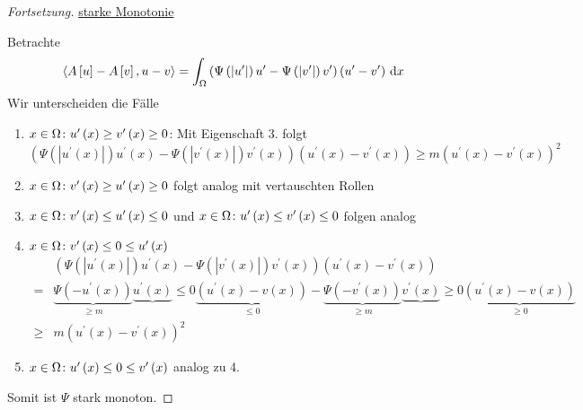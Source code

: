 \begin{proof}[Fortsetzung]
	\underline{starke Monotonie}
	
	Betrachte
	\begin{equation*}
		\left<A\left[u\right]-A\left[v\right],u-v\right> = \int_{\Omega}\left(\Psi\left(|u^{\prime}|\right)u^{\prime}-\Psi\left(|v^{\prime}|\right)v^{\prime}\right)\left(u^{\prime}-v^{\prime}\right)\,\mathrm{d} x
	\end{equation*}
	Wir unterscheiden die Fälle
	\begin{enumerate}
		\item $x\in\Omega\colon u^{\prime}\left(x\right)\geq v^{\prime}\left(x\right)\geq 0$: Mit Eigenschaft 3. folgt
		\begin{equation*}
			\left(\Psi\left(|u^{\prime}\left(x\right)|\right)u^{\prime}\left(x\right) - \Psi\left(|v^{\prime}\left(x\right)|\right)v^{\prime}\left(x\right)\right)\left(u^{\prime}\left(x\right)-v^{\prime}\left(x\right)\right) \geq m\left(u^{\prime}\left(x\right)-v^{\prime}\left(x\right)\right)^{2}
		\end{equation*}
		\item $x\in\Omega\colon v^{\prime}\left(x\right)\geq u^{\prime}\left(x\right)\geq 0$ folgt analog mit vertauschten Rollen
		\item $x\in\Omega\colon v^{\prime}\left(x\right)\leq u^{\prime}\left(x\right)\leq 0$ und $x\in\Omega\colon u^{\prime}\left(x\right)\leq v^{\prime}\left(x\right)\leq 0$ folgen analog
		\item $x\in\Omega\colon v^{\prime}\left(x\right)\leq 0 \leq u^{\prime}\left(x\right)${}
		\begin{align*}
			&\left(\Psi\left(|u^{\prime}\left(x\right)|\right)u^{\prime}\left(x\right)-\Psi\left(|v^{\prime}\left(x\right)|\right)v^{\prime}\left(x\right)\right)\left(u^{\prime}\left(x\right)-v^{\prime}\left(x\right)\right)\\ 
			= &\underbrace{\Psi\left(-u^{\prime}\left(x\right)\right)}_{\geq m}\underbrace{u^{\prime}\left(x\right)}{\leq 0}\underbrace{\left(u^{\prime}\left(x\right)-v\left(x\right)\right)}_{\leq 0} - \underbrace{\Psi\left(-v^{\prime}\left(x\right)\right)}_{\geq m}\underbrace{v^{\prime}\left(x\right)}{\geq 0}\underbrace{\left(u^{\prime}\left(x\right)-v\left(x\right)\right)}_{\geq 0} \\
			\geq &m\left(u^{\prime}\left(x\right)-v^{\prime}\left(x\right)\right)^{2}
		\end{align*}
		\item $x\in\Omega\colon u^{\prime}\left(x\right)\leq 0 \leq v^{\prime}\left(x\right)$ analog zu 4.
	\end{enumerate}
	Somit ist $\Psi$ stark monoton.
\end{proof}

